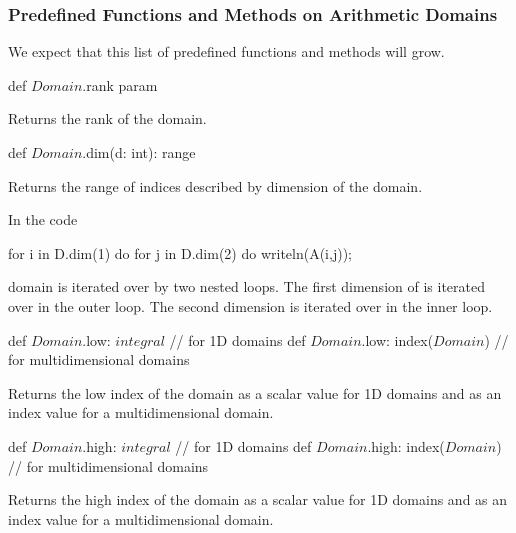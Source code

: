 \subsubsection{Predefined Functions and Methods on Arithmetic Domains}

We expect that this list of predefined functions and methods will
grow.

\begin{protohead}
def $Domain$.rank param
\end{protohead}
\begin{protobody}
Returns the rank of the domain.
\end{protobody}

\begin{protohead}
def $Domain$.dim(d: int): range
\end{protohead}
\begin{protobody}
Returns the range of indices described by dimension  of the
domain.
\end{protobody}

\begin{example}
In the code
\begin{chapel}
for i in D.dim(1) do
  for j in D.dim(2) do
    writeln(A(i,j));
\end{chapel}
domain  is iterated over by two nested loops.  The first
dimension of  is iterated over in the outer loop.  The second
dimension is iterated over in the inner loop.
\end{example}


\begin{protohead}
def $Domain$.low: $integral$        // for 1D domains
def $Domain$.low: index($Domain$)   // for multidimensional domains
\end{protohead}
\begin{protobody}
Returns the low index of the domain as a scalar value for 1D domains
and as an index value for a multidimensional domain.
\end{protobody}

\begin{protohead}
def $Domain$.high: $integral$        // for 1D domains
def $Domain$.high: index($Domain$)   // for multidimensional domains
\end{protohead}
\begin{protobody}
Returns the high index of the domain as a scalar value for 1D domains
and as an index value for a multidimensional domain.
\end{protobody}

